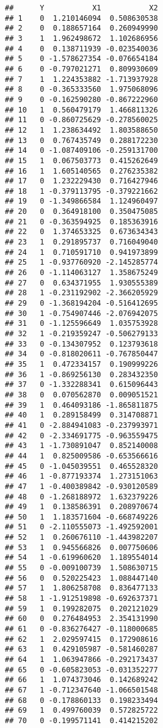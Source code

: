 \documentclass[
]{article}
\begin{document}
\begin{verbatim}
##      Y           X1           X2
## 1    0  1.210146094  0.508630538
## 2    0  0.188657164  0.260949990
## 3    1  1.962498672  1.102686956
## 4    0  0.138711939 -0.023540036
## 5    0 -1.578627354 -0.076654184
## 6    0 -0.797021271  0.809930609
## 7    1  1.224353882 -1.713937928
## 8    0 -0.365333560  1.975068096
## 9    0 -0.162590280 -0.867222960
## 10   1  0.560479179  1.466811326
## 11   0 -0.860725629 -0.278560025
## 12   1  1.238634492  1.803588650
## 13   0  0.767435749  0.288172230
## 14   0 -1.087409106 -0.259131700
## 15   1  0.067503773  0.415262649
## 16   1  1.605140565  0.276235382
## 17   0  1.232229430  0.716427946
## 18   1 -0.379113795 -0.379221662
## 19   0 -1.349866584  1.124960497
## 20   0  0.364918100  0.350475085
## 21   0 -0.363594925  0.185363916
## 22   0  1.374653325  0.673634343
## 23   1  0.291895737  0.716049040
## 24   1  0.710591710  0.941973899
## 25   1 -0.937760920 -2.145285774
## 26   0 -1.114063127  1.358675249
## 27   0  0.634371955  1.930555389
## 28   1 -0.231192902 -2.366205929
## 29   0 -1.368194204 -0.516412695
## 30   1 -0.754907446 -2.076942075
## 31   0 -1.125596649  1.035753928
## 32   1 -0.219359247 -0.506279133
## 33   0 -0.134307952  0.123793618
## 34   0 -0.818020611 -0.767850447
## 35   1  0.472334157  0.190999226
## 36   1 -0.869256130  0.283432350
## 37   0 -1.332288341  0.615096443
## 38   0  0.070562870  0.009051521
## 39   1  0.464093186 -1.865811875
## 40   1  0.289158499  0.314708871
## 41   0 -2.884941083 -0.237993971
## 42   0 -2.334691775 -0.963559475
## 43   1 -1.730891047  0.852140008
## 44   1  0.825009586 -0.653566616
## 45   0 -1.045039551  0.465528320
## 46   1 -0.877193374  1.273151063
## 47   1 -0.400389842 -0.930120589
## 48   0 -1.268188972  1.632379226
## 49   1  0.138586391  0.208970674
## 50   1  1.183571604 -0.668749226
## 51   0 -2.110555073 -1.492592001
## 52   1  0.260676110 -1.443982207
## 53   1  0.945566826  0.007750606
## 54   1 -0.619960620  1.189554014
## 55   0 -0.009100739  1.508630715
## 56   0  0.520225423  1.088447140
## 57   1  1.806258708  0.836477133
## 58   1 -1.912519898 -0.692637371
## 59   1  0.199282075  0.202121029
## 60   0  0.276484953  2.354131990
## 61   0 -0.836276427 -0.118000685
## 62   1  2.029597415  0.172908616
## 63   1  0.429105987 -0.581460287
## 64   1  1.063947866 -0.292173437
## 65   0 -0.605823053 -0.031352277
## 66   1  1.074373046  0.142689242
## 67   1 -0.712347640 -1.066501548
## 68   0 -0.178860133  0.198233494
## 69   1  0.499760039  0.572825722
## 70   0 -0.199571141  0.414215202

\end{verbatim}
\end{document}
